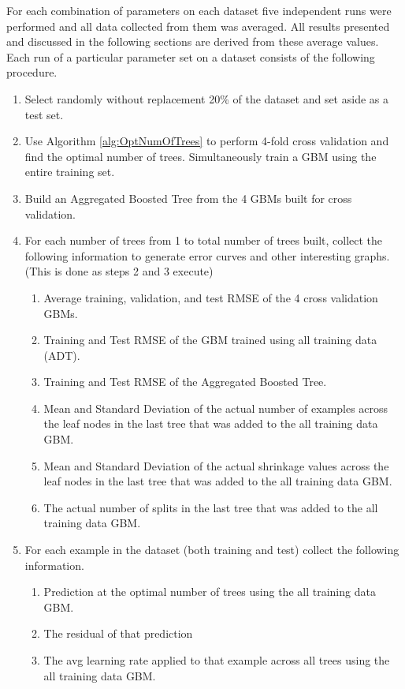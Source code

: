 \documentclass[9pt, conference]{IEEEtran}
\begin{document}
For each combination of parameters on each dataset five independent runs were performed and all data collected from them was averaged. All results  presented and discussed in the following sections are derived from these average values. Each run of a particular parameter set on a dataset consists of the following procedure.
\begin{enumerate}
	\item Select randomly without replacement 20\% of the dataset and set aside as a test set.
	\item Use Algorithm \ref{alg:OptNumOfTrees} to perform 4-fold cross validation and find the optimal number of trees. Simultaneously train a GBM using the entire training set. 
	\item Build an Aggregated Boosted Tree from the 4 GBMs built for cross validation.
	\item For each number of trees from 1 to total number of trees built, collect the following information to generate error curves and other interesting graphs. (This is done as steps 2 and 3 execute)
		\begin{enumerate}
		\item Average training, validation, and test RMSE of the 4 cross validation GBMs.
		\item Training and Test RMSE of the GBM trained using all training data (ADT).
		\item Training and Test RMSE of the Aggregated Boosted Tree.
		\item Mean and Standard Deviation of the actual number of examples across the leaf nodes in the last tree that was added to the all training data GBM.
		\item Mean and Standard Deviation of the actual shrinkage values across the leaf nodes in the last tree that was added to the all training data GBM.
		\item The actual number of splits in the last tree that was added to the all training data GBM.
		\end{enumerate}
	\item For each example in the dataset (both training and test) collect the following information.
	\begin{enumerate}
		\item Prediction at the optimal number of trees using the all training data GBM.
		\item The residual of that prediction
		\item The avg learning rate applied to that example across all trees using the all training data GBM.
	\end{enumerate}


\end{enumerate}
\end{document}
